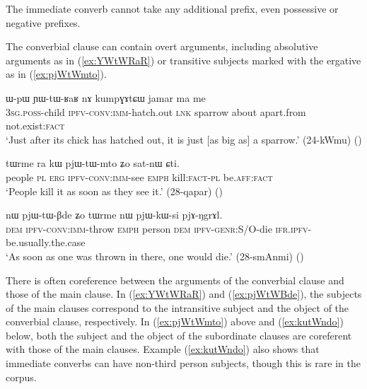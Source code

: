 The immediate converb cannot take any additional prefix, even possessive or negative prefixes.

The converbial clause can contain overt arguments, including  absolutive arguments as in (\ref{ex:YWtWRaR}) or transitive subjects marked with the ergative as in (\ref{ex:pjWtWmto}). 

\begin{exe}
\ex \label{ex:YWtWRaR} 
\gll  ɯ-pɯ ɲɯ-tɯ-ʁaʁ nɤ kumpɣɤtɕɯ jamar ma me	\\
\textsc{3sg}.\textsc{poss}-child \textsc{ipfv}-\textsc{conv}:\textsc{imm}-hatch.out \textsc{lnk} sparrow about apart.from not.exist:\textsc{fact} \\
\glt `Just after its chick has hatched out, it is just [as big as] a sparrow.' (24-kWmu) ()
\end{exe}

\begin{exe}
\ex \label{ex:pjWtWmto}
\gll tɯrme ra kɯ pjɯ-tɯ-mto ʑo sat-nɯ ɕti.    \\
people \textsc{pl} \textsc{erg} \textsc{ipfv}-\textsc{conv}:\textsc{imm}-see \textsc{emph} kill:\textsc{fact}-\textsc{pl} be.\textsc{aff}:\textsc{fact} \\
\glt  `People kill it as soon as they see it.' (28-qapar)
()
\end{exe}


\begin{exe}
\ex \label{ex:pjWtWBde} 
\gll nɯ pjɯ-tɯ-βde ʑo tɯrme nɯ pjɯ-kɯ-si pjɤ-ŋgrɤl. \\
\textsc{dem} \textsc{ipfv}-\textsc{conv}:\textsc{imm}-throw \textsc{emph} person \textsc{dem} \textsc{ipfv}-\textsc{genr}:S/O-die \textsc{ifr}.\textsc{ipfv}-be.usually.the.case \\
\glt `As soon as one was thrown in there, one would die.' (28-smAnmi) ()
\end{exe}

There is often coreference between the arguments of the converbial clause and those of the main clause. In (\ref{ex:YWtWRaR}) and (\ref{ex:pjWtWBde}), the subjects of the main clauses correspond to the intransitive subject and the object of the converbial clause, respectively. In (\ref{ex:pjWtWmto}) above and (\ref{ex:kutWndo}) below, both the subject and the object of the subordinate clauses are coreferent with those of the main clauses. Example (\ref{ex:kutWndo}) also shows that immediate converbs can have non-third person subjects, though this is rare in the corpus.

